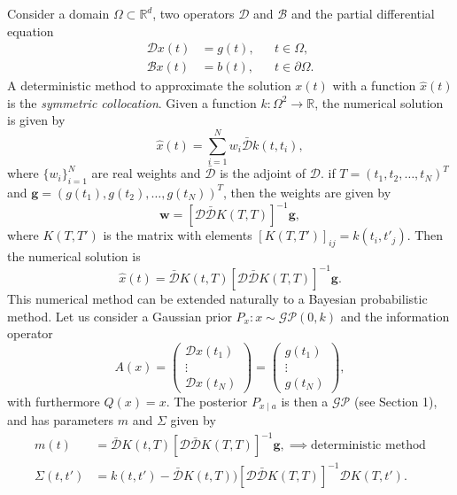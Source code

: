 \documentclass{scrartcl}
\theoremstyle{definition}
\theoremstyle{remark}
\numberwithin{definition}{section}
\numberwithin{remark}{section}
\newcommand{\R}{\mathbb{R}}
\newcommand{\GP}{\mathcal{GP}}
\begin{document}
Consider a domain $\Omega \subset \R^d$, two operators $\mathcal{D}$ and $\mathcal{B}$ and the partial differential equation
\begin{equation}
\begin{aligned}
	\mathcal{D} x(t) &= g(t), && t \in \Omega, \\
	\mathcal{B} x(t) &= b(t), && t \in \partial \Omega.
\end{aligned}
\end{equation}
A deterministic method to approximate the solution $x(t)$ with a function $\hat x(t)$ is the \textit{symmetric collocation}. Given a function $k\colon \Omega^2 \to \R$, the numerical solution is given by
\begin{equation}
	\hat x(t) = \sum_{i=1}^{N} w_i \bar{\mathcal{D}} k(t, t_i),
\end{equation}
where $\{w_i\}_{i=1}^N$ are real weights and $\bar{\mathcal{D}}$ is the adjoint of $\mathcal{D}$. if $T = (t_1, t_2, \ldots, t_N)^T$ and $\mathbf{g} = (g(t_1), g(t_2), \ldots, g(t_N))^T$, then the weights are given by
\begin{equation}
	\mathbf{w} = [\mathcal{D} \bar{\mathcal{D}}K(T,T)]^{-1}\mathbf{g},
\end{equation}
where $K(T, T')$ is the matrix with elements $[K(T, T')]_{ij} = k(t_i, t'_j)$. Then the numerical solution is
\begin{equation}
	\hat x(t) = \bar{\mathcal{D}}K(t,T)[\mathcal{D} \bar{\mathcal{D}}K(T,T)]^{-1}\mathbf{g}.
\end{equation}
This numerical method can be extended naturally to a Bayesian probabilistic method. Let us consider a Gaussian prior $P_x \colon x \sim \GP(0,k)$ and the information operator
\begin{equation}
	A(x) = \begin{pmatrix} \mathcal{D}x(t_1) \\ \vdots \\ \mathcal{D}x(t_N) \end{pmatrix}
	     = \begin{pmatrix} g(t_1) \\ \vdots \\ g(t_N) \end{pmatrix},
\end{equation}
with furthermore $Q(x) = x$. The posterior $P_{x\mid a}$ is then a $\GP$ (see Section 1), and has parameters $m$ and $\Sigma$ given by
\begin{equation}\label{eq:meanVarFwdPr}
\begin{aligned}
	m(t) &= \bar{\mathcal{D}}K(t,T)[\mathcal{D} \bar{\mathcal{D}}K(T,T)]^{-1}\mathbf{g}, \implies \text{deterministic method}\\
	\Sigma(t, t') &= k(t, t') - \bar{\mathcal{D}}K(t, T))[\mathcal{D} \bar{\mathcal{D}}K(T,T)]^{-1}\mathcal{D}K(T, t').
\end{aligned}
\end{equation}
\end{document}
